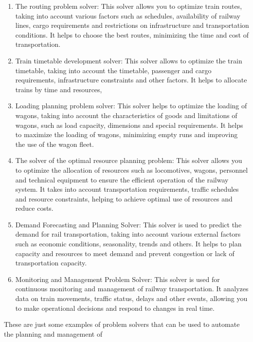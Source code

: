 \documentclass[a4paper]{article}
\begin{document}
\begin{multicols}{2}
\renewcommand{\labelenumi}{\theenumi)} %
\begin{enumerate} [itemsep=-5pt, labelsep=5pt]
 
 \item The routing problem solver: This solver allows
you to optimize train routes, taking into account
various factors such as schedules, availability of
railway lines, cargo requirements and restrictions
on infrastructure and transportation conditions. It
helps to choose the best routes, minimizing the
time and cost of transportation.
\item Train timetable development solver: This solver
allows to optimize the train timetable, taking into
account the timetable, passenger and cargo requirements, infrastructure constraints and other factors.
It helps to allocate trains by time and resources, 
\item Loading planning problem solver: This solver helps
to optimize the loading of wagons, taking into
account the characteristics of goods and limitations
of wagons, such as load capacity, dimensions and
special requirements. It helps to maximize the
loading of wagons, minimizing empty runs and
improving the use of the wagon fleet.
\item The solver of the optimal resource planning problem: This solver allows you to optimize the allocation of resources such as locomotives, wagons,
personnel and technical equipment to ensure the efficient operation of the railway system. It takes into
account transportation requirements, traffic schedules and resource constraints, helping to achieve
optimal use of resources and reduce costs.
\item Demand Forecasting and Planning Solver: This
solver is used to predict the demand for rail
transportation, taking into account various external
factors such as economic conditions, seasonality,
trends and others. It helps to plan capacity and
resources to meet demand and prevent congestion
or lack of transportation capacity.
\item Monitoring and Management Problem Solver: This
solver is used for continuous monitoring and management of railway transportation. It analyzes data
on train movements, traffic status, delays and other
events, allowing you to make operational decisions
and respond to changes in real time.
\end{enumerate}
{\hspace{0.2cm}} These are just some examples of problem solvers that
can be used to automate the planning and management of

\end{multicols}
\end{document}
